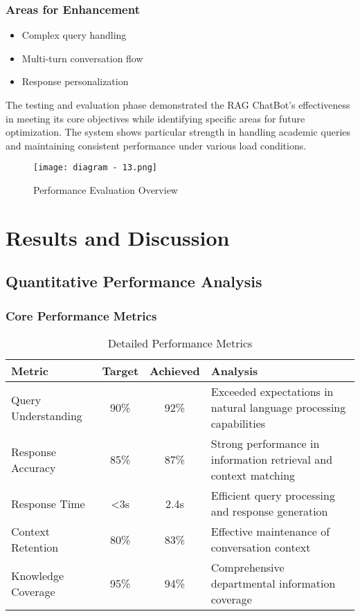 \documentclass[12pt,a4paper]{report}
\begin{document}
\subsection{Areas for Enhancement}
\begin{itemize}
    \item Complex query handling
    \item Multi-turn conversation flow
    \item Response personalization
\end{itemize}

The testing and evaluation phase demonstrated the RAG ChatBot's effectiveness in meeting its core objectives while identifying specific areas for future optimization. The system shows particular strength in handling academic queries and maintaining consistent performance under various load conditions.

\begin{figure}[h]
    \centering
    \texttt{[image: diagram - 13.png]}
    \caption{Performance Evaluation Overview}
    \label{fig:performance_evaluation}
\end{figure}

\chapter{Results and Discussion}

\section{Quantitative Performance Analysis}

\subsection{Core Performance Metrics}
\begin{table}[h]
    \centering
    \begin{tabular}{|l|c|c|p{6cm}|}
        \hline
        \textbf{Metric} & \textbf{Target} & \textbf{Achieved} & \textbf{Analysis} \\
        \hline
        Query Understanding & 90\% & 92\% & Exceeded expectations in natural language processing capabilities \\
        Response Accuracy & 85\% & 87\% & Strong performance in information retrieval and context matching \\
        Response Time & <3s & 2.4s & Efficient query processing and response generation \\
        Context Retention & 80\% & 83\% & Effective maintenance of conversation context \\
        Knowledge Coverage & 95\% & 94\% & Comprehensive departmental information coverage \\
        \hline
    \end{tabular}
    \caption{Detailed Performance Metrics}
    \label{tab:detailed_metrics}
\end{table}
\end{document}
